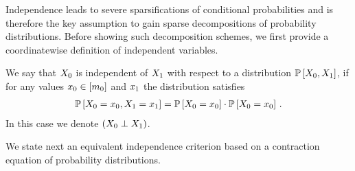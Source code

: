 
Independence leads to severe sparsifications of conditional probabilities and is therefore the key assumption to gain sparse decompositions of probability distributions.
Before showing such decomposition schemes, we first provide a coordinatewise definition of independent variables.

\begin{definition}[Independence]
    \label{def:independence}
    We say that $X_{0}$ is independent of $X_{1}$ with respect to a distribution $\mathbb{P}\left[X_{0},X_{1}\right]$, if for any values $x_{0}\in[m_{0}]$ and $x_{1}$ the distribution satisfies
    \begin{align*}
        \mathbb{P}\left[X_{0}=x_{0},X_{1}=x_{1}\right]
        = \mathbb{P}\left[X_{0}=x_{0}\right]\cdot\mathbb{P}\left[X_{0}=x_{0}\right] \, .
    \end{align*}
    In this case we denote $\left(X_{0}\perp X_{1}\right)$.
\end{definition}

We state next an equivalent independence criterion based on a contraction equation of probability distributions.

